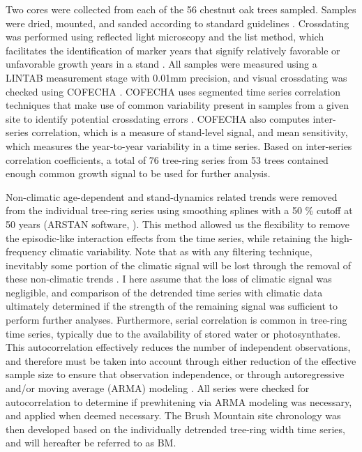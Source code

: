 Two cores were collected from each of the 56 chestnut oak trees sampled. Samples were dried, mounted, and sanded according to standard guidelines \cite{stokes1996introduction}. Crossdating was performed using reflected light microscopy and the list method, which facilitates the identification of marker years that signify relatively favorable or unfavorable growth years in a stand \cite{yamaguchi1991simple}. All samples were measured using a LINTAB measurement stage with 0.01mm precision, and visual crossdating was checked using COFECHA \cite{holmes1983computer}. COFECHA uses segmented time series correlation techniques that make use of common variability present in samples from a given site to identify potential crossdating errors \cite{grissino2001research}. COFECHA also computes inter-series correlation, which is a measure of stand-level signal, and mean sensitivity, which measures the year-to-year variability in a time series. Based on inter-series correlation coefficients, a total of 76 tree-ring series from 53 trees contained enough common growth signal to be used for further analysis.

Non-climatic age-dependent and stand-dynamics related trends were removed from the individual tree-ring series using smoothing splines with a 50 \% cutoff at 50 years (ARSTAN software, \cite{cook1997calculating}). This method allowed us the flexibility to remove the episodic-like interaction effects from the time series, while retaining the high-frequency climatic variability. Note that as with any filtering technique, inevitably some portion of the climatic signal will be lost through the removal of these non-climatic trends \cite{cook1981smoothing}.  I  here assume that the loss of climatic signal was negligible, and comparison of the detrended time series with climatic data ultimately determined if the strength of the remaining signal was sufficient to perform further analyses. Furthermore, serial correlation is common in tree-ring time series, typically due to the availability of stored water or photosynthates. This autocorrelation effectively reduces the number of independent observations, and therefore must be taken into account through either reduction of the effective sample size to ensure that observation independence, or through autoregressive and/or moving average (ARMA)\label{sym:ARMA} modeling \cite{monserud1986time, cook1987decomposition}. All series were checked for autocorrelation to determine if prewhitening via ARMA modeling was necessary, and applied when deemed necessary. The Brush Mountain site chronology was then developed based on the individually detrended tree-ring width time series, and will hereafter be referred to as BM. \label{sym:BM}

